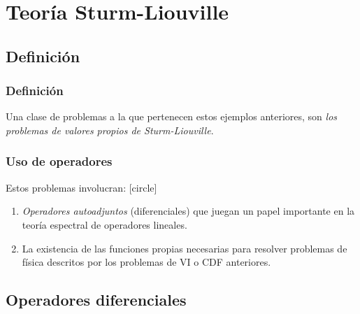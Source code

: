 \documentclass[12pt]{beamer}
\begin{document}
\section{Teoría Sturm-Liouville}
\subsection{Definición}

\begin{frame}
\frametitle{Definición}
Una clase de problemas a la que pertenecen estos ejemplos anteriores, son \emph{los problemas de valores propios de Sturm-Liouville}.
\end{frame}
\begin{frame}
\frametitle{Uso de operadores}
Estos problemas involucran:
[circle]
\begin{enumerate}[<+->]
\item \emph{Operadores autoadjuntos} (diferenciales) que juegan un papel importante en la teoría espectral de operadores lineales.
\item La existencia de las funciones propias necesarias para resolver problemas de física descritos por los problemas de VI o CDF anteriores.
\end{enumerate}
\end{frame}

\subsection{Operadores diferenciales}
\end{document}
